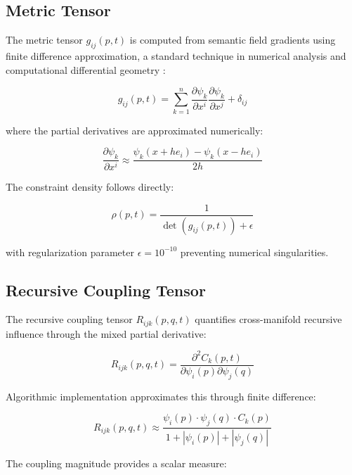 \subsection{Metric Tensor}

The metric tensor $g_{ij}(p,t)$ is computed from semantic field gradients using finite difference approximation, a standard technique in numerical analysis and computational differential geometry \autocite{BurdenFairesBurden2015}:

\begin{equation}
g_{ij}(p,t) = \sum_{k=1}^n \frac{\partial \psi_k}{\partial x^i} \frac{\partial \psi_k}{\partial x^j} + \delta_{ij}
\end{equation}

where the partial derivatives are approximated numerically:

\begin{equation}
\frac{\partial \psi_k}{\partial x^i} \approx \frac{\psi_k(x + h e_i) - \psi_k(x - h e_i)}{2h}
\end{equation}

The constraint density follows directly:

\begin{equation}
\rho(p,t) = \frac{1}{\det(g_{ij}(p,t)) + \epsilon}
\end{equation}

with regularization parameter $\epsilon = 10^{-10}$ preventing numerical singularities.

\subsection{Recursive Coupling Tensor}

The recursive coupling tensor $R_{ijk}(p,q,t)$ quantifies cross-manifold recursive influence through the mixed partial derivative:

\begin{equation}
R_{ijk}(p,q,t) = \frac{\partial^2 C_k(p,t)}{\partial \psi_i(p) \partial \psi_j(q)}
\end{equation}

Algorithmic implementation approximates this through finite difference:

\begin{equation}
R_{ijk}(p,q,t) \approx \frac{\psi_i(p) \cdot \psi_j(q) \cdot C_k(p)}{1 + |\psi_i(p)| + |\psi_j(q)|}
\end{equation}

The coupling magnitude provides a scalar measure:

